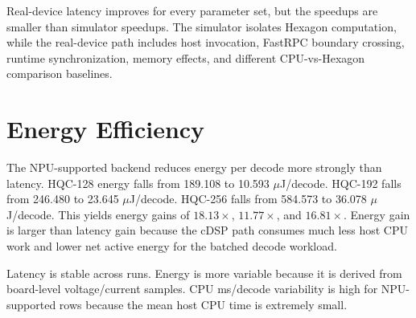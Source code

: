 \documentclass[12pt,a4paper]{report}
\begin{document}
Real-device latency improves for every parameter set, but the speedups are smaller than simulator speedups. The simulator isolates Hexagon computation, while the real-device path includes host invocation, FastRPC boundary crossing, runtime synchronization, memory effects, and different CPU-vs-Hexagon comparison baselines.

\section{Energy Efficiency}
The NPU-supported backend reduces energy per decode more strongly than latency. HQC-128 energy falls from 189.108 to 10.593 \(\mu\)J/decode. HQC-192 falls from 246.480 to 23.645 \(\mu\)J/decode. HQC-256 falls from 584.573 to 36.078 \(\mu\)J/decode. This yields energy gains of \(18.13\times\), \(11.77\times\), and \(16.81\times\). Energy gain is larger than latency gain because the cDSP path consumes much less host CPU work and lower net active energy for the batched decode workload.

\begin{table}[h]
\centering
\caption{Run-to-run variability for direct real-device measurements.}
\label{tab:real-device-cv}
\end{table}

Latency is stable across runs. Energy is more variable because it is derived from board-level voltage/current samples. CPU ms/decode variability is high for NPU-supported rows because the mean host CPU time is extremely small.
\end{document}
